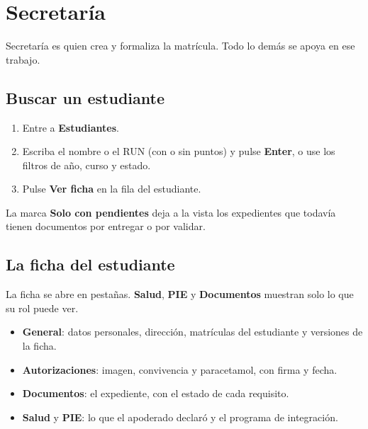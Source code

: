 \section{Secretaría}

Secretaría es quien crea y formaliza la matrícula. Todo lo demás se apoya en
ese trabajo.

\subsection{Buscar un estudiante}

\begin{enumerate}[leftmargin=*,itemsep=0.2em]
\item Entre a \textbf{Estudiantes}.
\item Escriba el nombre o el RUN (con o sin puntos) y pulse \textbf{Enter}, o
  use los filtros de año, curso y estado.
\item Pulse \textbf{Ver ficha} en la fila del estudiante.
\end{enumerate}


La marca \textbf{Solo con pendientes} deja a la vista los expedientes que
todavía tienen documentos por entregar o por validar.

\subsection{La ficha del estudiante}

La ficha se abre en pestañas. \textbf{Salud}, \textbf{PIE} y
\textbf{Documentos} muestran solo lo que su rol puede ver.


\begin{itemize}[leftmargin=*,itemsep=0.2em]
\item \textbf{General}: datos personales, dirección, matrículas del estudiante
  y versiones de la ficha.
\item \textbf{Autorizaciones}: imagen, convivencia y paracetamol, con firma y
  fecha.
\item \textbf{Documentos}: el expediente, con el estado de cada requisito.
\item \textbf{Salud} y \textbf{PIE}: lo que el apoderado declaró y el programa
  de integración.
\end{itemize}


